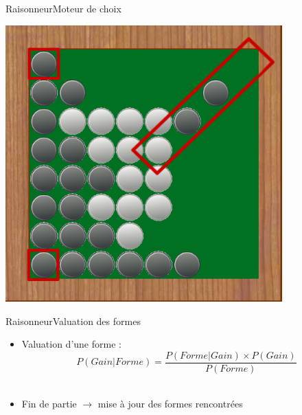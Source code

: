 \begin{frame}{Raisonneur}{Moteur de choix}
\begin{minipage}{0.45\textwidth}
{			\includegraphics[width=0.8\textwidth]{img/screenshoot/raisonneur_choix_2}	
		}
	\end{minipage}
	\begin{minipage}{0.50\textwidth}
		\begin{itemize}
		\end{itemize}
	\end{minipage}
\end{frame}

\begin{frame}{Raisonneur}{Valuation des formes}
	\begin{itemize}
			\item Valuation d'une forme :
			\[ P(Gain|Forme) = \frac{P(Forme|Gain) \times P(Gain)}{P(Forme)} \]\\[20pt]
			\item Fin de partie $\rightarrow$ mise à jour des formes rencontrées
		\end{itemize}
	
\end{frame}

